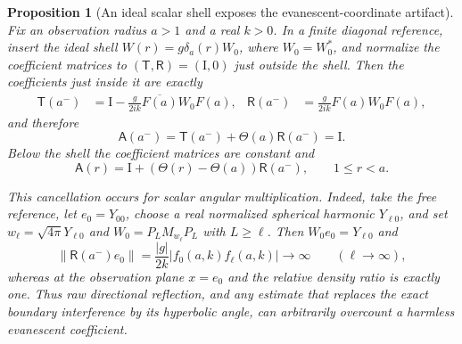 \documentclass[11pt]{article}
\newcommand{\Id}{\mathrm I}
\newtheorem{proposition}[theorem]{Proposition}
\theoremstyle{definition}
\theoremstyle{remark}
\begin{document}
\begin{proposition}[An ideal scalar shell exposes the evanescent-coordinate artifact]
\label{prop:ideal-shell-reflection-artifact}
Fix an observation radius $a>1$ and a real $k>0$.  In a finite diagonal
reference, insert the ideal shell
$W(r)=g\delta_a(r)W_0$, where $W_0=W_0^*$, and normalize the coefficient
matrices to $(\mathsf T,\mathsf R)=(\Id,0)$ just outside the shell.  Then the
coefficients just inside it are exactly
\begin{align}
 \mathsf T(a^-)&=\Id-\frac{g}{2ik}
   \overline{F(a)}W_0F(a),
 &
 \mathsf R(a^-)&=\frac{g}{2ik}F(a)W_0F(a),
 \label{eq:ideal-shell-coefficients}
\end{align}
and therefore
\begin{equation}
 \mathsf A(a^-)=\mathsf T(a^-)+\Theta(a)\mathsf R(a^-)=\Id.
 \label{eq:ideal-shell-exact-cancellation}
\end{equation}
Below the shell the coefficient matrices are constant and
\begin{equation}
 \mathsf A(r)=\Id+\left(\Theta(r)-\Theta(a)\right)\mathsf R(a^-),
 \qquad 1\leq r<a.
 \label{eq:ideal-shell-refocusing-drift}
\end{equation}

This cancellation occurs for scalar angular multiplication.  Indeed, take the
free reference, let $e_0=Y_{00}$, choose a real normalized spherical harmonic
$Y_{\ell0}$, and set
$w_\ell=\sqrt{4\pi}Y_{\ell0}$ and
$W_0=P_LM_{w_\ell}P_L$ with $L\geq\ell$.  Then
$W_0e_0=Y_{\ell0}$ and
\begin{equation}
 \|\mathsf R(a^-)e_0\|
 =\frac{|g|}{2k}|f_0(a,k)f_\ell(a,k)|
 \longrightarrow\infty
 \qquad(\ell\to\infty),
 \label{eq:ideal-shell-raw-reflection-diverges}
\end{equation}
whereas at the observation plane $x=e_0$ and the relative density ratio is
exactly one.  Thus raw directional reflection, and any estimate that replaces
the exact boundary interference by its hyperbolic angle, can arbitrarily
overcount a harmless evanescent coefficient.
\end{proposition}
\end{document}
